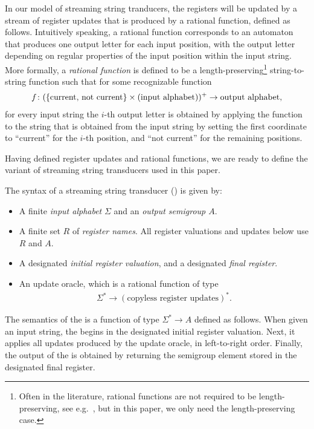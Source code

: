 In our model of streaming string tranducers, the registers will be updated by a stream of register updates that is produced by a {rational function}, defined as follows.  Intuitively speaking, a rational function corresponds to an automaton that produces one output letter for each input position, with the output letter depending on regular properties of the input position within the input string. More formally, a \emph{rational function} is defined to be a length-preserving\footnote{Often in the literature, rational functions are not required to be length-preserving, see e.g.~\cite[p.~525]{sakarovitch2009elements}, but in this paper, we only need the length-preserving case.} string-to-string function such that for some recognizable function 
\begin{align*}
 f\colon (\{\text{current, not current}\} \times \text{(input alphabet)})^+ \to \text{output alphabet},
\end{align*}
for every input string the  $i$-th output letter is obtained by applying the function
to the string that is obtained from the input string by setting the first coordinate to ``current'' for the $i$-th position, and ``not current'' for the remaining positions.  

Having defined register updates and rational functions, we are ready to define the variant of streaming string transducers used in this paper.



\begin{definition}\label{def:usual-sst}
    The syntax of a streaming string transducer (\sst) is given by:
\begin{itemize}
    \item A finite \emph{input alphabet} $\Sigma$ and an \emph{output semigroup $A$}.
    \item A finite set $R$ of \emph{register names}. All register valuations and updates below use $R$ and $A$.
    \item A designated \emph{initial register valuation}, and a designated \emph{final register}.
    \item An update oracle, which is a rational function of type 
    \begin{align*}
    \Sigma^* \to (\text{copyless register updates})^*.
    \end{align*}
\end{itemize}
\end{definition}

The semantics of the \sst{} is a function of type $\Sigma^* \to A$ defined as follows. When given an input string, the \sst{} begins in the designated initial register valuation. Next, it applies all updates produced by the update oracle, in left-to-right order. Finally, the output of the \sst{} is obtained by returning the semigroup element stored in the designated final register. 

